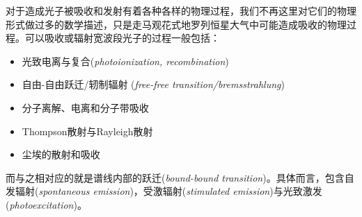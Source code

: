 对于造成光子被吸收和发射有着各种各样的物理过程，我们不再这里对它们的物理形式做过多的数学描述，只是走马观花式地罗列恒星大气中可能造成吸收的物理过程。可以吸收或辐射宽波段光子的过程一般包括\parencite{Wang1993}：
\begin{itemize}
	\item 光致电离与复合(\textit{photoionization, recombination})
	\item 自由-自由跃迁/轫制辐射 (\textit{free-free transition/bremsstrahlung})
	\item 分子离解、电离和分子带吸收
	\item Thompson散射与Rayleigh散射
	\item 尘埃的散射和吸收
\end{itemize}
而与之相对应的就是谱线内部的跃迁(\textit{bound-bound transition})。具体而言，包含自发辐射(\textit{spontaneous emission})，受激辐射(\textit{stimulated emission})与光致激发(\textit{photoexcitation})。


